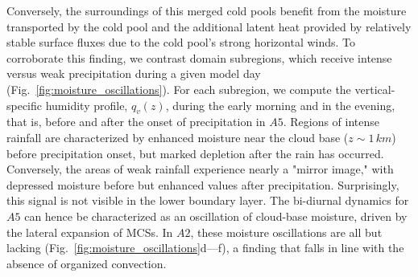 \documentclass{article}
\begin{document}
Conversely, the surroundings of this merged cold pools benefit from the moisture transported by the cold pool and the additional latent heat provided by relatively stable surface fluxes due to the cold pool's strong horizontal winds.
To corroborate this finding, we contrast domain subregions, which receive intense versus weak precipitation during a given model day (Fig.~\ref{fig:moisture_oscillations}).
For each subregion, we compute the vertical-specific humidity profile, $q_v(z)$, during the early morning and in the evening, that is, before and after the onset of precipitation in $A5$.
Regions of intense rainfall are characterized by enhanced moisture near the cloud base ($z\sim 1\, km$) before precipitation onset, but marked depletion after the rain has occurred.
Conversely, the areas of weak rainfall experience nearly a "mirror image," with depressed moisture before but enhanced values after precipitation. Surprisingly, this signal is not visible in the lower boundary layer. 
The bi-diurnal dynamics for $A5$ can hence be characterized as an oscillation of cloud-base moisture, driven by the lateral expansion of MCSs.
In $A2$, these moisture oscillations are all but lacking (Fig.~\ref{fig:moisture_oscillations}d---f), a finding that falls in line with the absence of organized convection.
\end{document}
